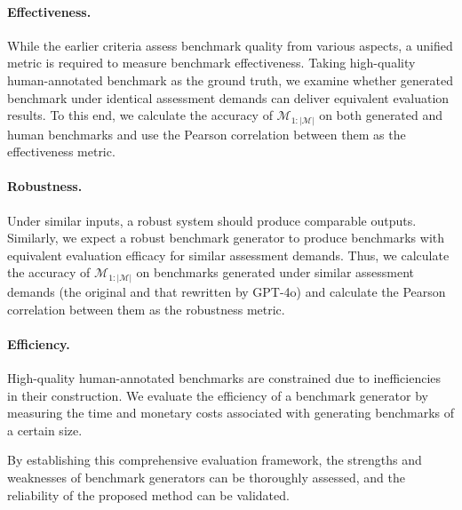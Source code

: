 \paragraph{Effectiveness.}
While the earlier criteria assess benchmark quality from various aspects, a unified metric is required to measure benchmark effectiveness.
Taking high-quality human-annotated benchmark as the ground truth, we examine whether generated benchmark under identical assessment demands can deliver equivalent evaluation results.
To this end, we calculate the accuracy of $\mathcal{M}_{1:|\mathcal{M}|}$ on both generated and human benchmarks and use the Pearson correlation between them as the effectiveness metric.

\paragraph{Robustness.}
Under similar inputs, a robust system should produce comparable outputs. Similarly, we expect a robust benchmark generator to produce benchmarks with equivalent evaluation efficacy for similar assessment demands. Thus, we calculate the accuracy of $\mathcal{M}_{1:|\mathcal{M}|}$ on benchmarks generated under similar assessment demands (the original and that rewritten by GPT-4o) and calculate the Pearson correlation between them as the robustness metric.

\paragraph{Efficiency.} 
High-quality human-annotated benchmarks are constrained due to inefficiencies in their construction. We evaluate the efficiency of a benchmark generator by measuring the time and monetary costs associated with generating benchmarks of a certain size.

By establishing this comprehensive evaluation framework, the strengths and weaknesses of benchmark generators can be thoroughly assessed, and the reliability of the proposed method can be validated.


